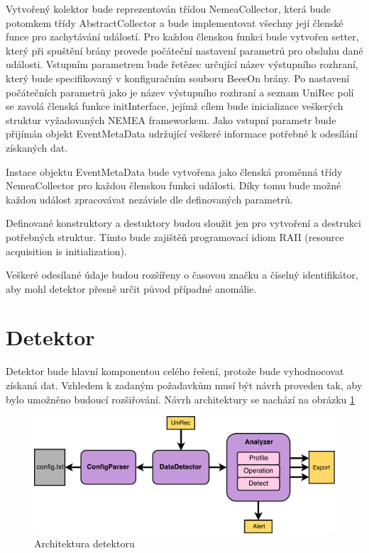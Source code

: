  Vytvořený kolektor bude reprezentován třídou NemeaCollector, která bude potomkem třídy
 AbstractCollector a bude implementovat všechny její členské funce pro zachytávání událostí. Pro každou 
 členskou funkci  bude vytvořen setter, který při spuštění brány provede počáteční nastavení
 parametrů pro obsluhu dané 
 události. Vstupním parametrem bude řetězec určující název výstupního rozhraní, který bude
 specifikovaný v 
 konfiguračním souboru BeeeOn brány. Po nastavení počátečních parametrů jako je název výstupního
 rozhraní a seznam UniRec polí se zavolá členská funkce initInterface, jejímž cílem bude inicializace
 veškerých struktur vyžadovaných NEMEA frameworkem.
 Jako vstupní parametr bude přijímán objekt EventMetaData udržující veškeré informace potřebné 
 k odesílání získaných dat.
 
 Instace objektu EventMetaData bude vytvořena jako členská proměnná třídy NemeaCollector
 pro každou členskou funkci události. Díky tomu bude možné každou událost zpracovávat nezávisle dle
 definovaných parametrů.
 
 Definované konstruktory a destuktory budou sloužit jen pro vytvoření a destrukci potřebných 
 struktur. Tímto bude zajištěň programovací idiom RAII (resource acquisition is initialization).
 
 Veškeré odesílané údaje budou rozšířeny o časovou značku a číselný identifikátor, aby mohl detektor
 přesně určit původ případné anomálie.
    
 \section{Detektor}
 Detektor bude hlavní komponentou celého řešení, protože bude vyhodnocovat získaná dat. Vzhledem
 k zadaným požadavkům musí být návrh proveden tak, aby bylo umožněno budoucí rozšiřování. Návrh 
 architektury se nachází na obrázku \ref{obr.detektor}
 \begin{figure}[ht]
   \begin{center}
   \includegraphics[scale=0.5]{pictures/detektor-arch}
   \caption{Architektura detektoru}
   \label{obr.detektor}
   \end{center}
   \end{figure}

